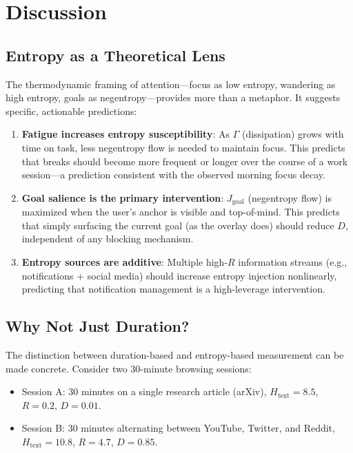 \documentclass[10pt,letterpaper]{article}
\begin{document}
\section{Discussion}
\label{sec:discussion}

\subsection{Entropy as a Theoretical Lens}

The thermodynamic framing of attention---focus as low entropy, wandering as high entropy, goals as negentropy---provides more than a metaphor. It suggests specific, actionable predictions:

\begin{enumerate}[noitemsep]
    \item \textbf{Fatigue increases entropy susceptibility}: As $\Gamma$ (dissipation) grows with time on task, less negentropy flow is needed to maintain focus. This predicts that breaks should become more frequent or longer over the course of a work session---a prediction consistent with the observed morning focus decay.
    \item \textbf{Goal salience is the primary intervention}: $J_{\text{goal}}$ (negentropy flow) is maximized when the user's anchor is visible and top-of-mind. This predicts that simply surfacing the current goal (as the overlay does) should reduce $D$, independent of any blocking mechanism.
    \item \textbf{Entropy sources are additive}: Multiple high-$R$ information streams (e.g., notifications + social media) should increase entropy injection nonlinearly, predicting that notification management is a high-leverage intervention.
\end{enumerate}

\subsection{Why Not Just Duration?}

The distinction between duration-based and entropy-based measurement can be made concrete. Consider two 30-minute browsing sessions:

\begin{itemize}[noitemsep]
    \item Session A: 30 minutes on a single research article (arXiv), $H_{\text{text}} = 8.5$, $R = 0.2$, $D = 0.01$.
    \item Session B: 30 minutes alternating between YouTube, Twitter, and Reddit, $H_{\text{text}} = 10.8$, $R = 4.7$, $D = 0.85$.
\end{itemize}
\end{document}
